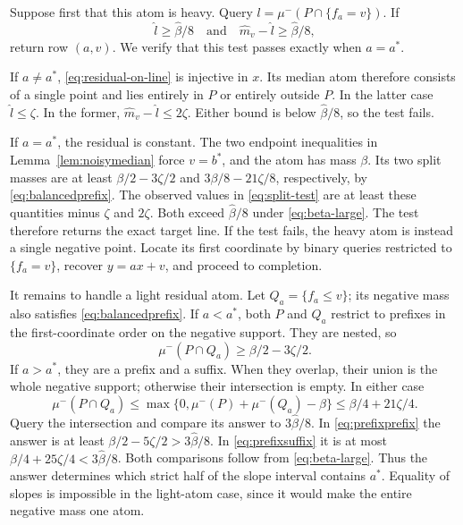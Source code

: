 \documentclass[11pt,letterpaper,pmlr,twoside]{jmlr}
\begin{document}
Suppose first that this atom is heavy. Query $l=\mu^-(P\cap\{f_a=v\})$. If
\begin{equation}
 \hat l\ge\hat\beta/8\quad\text{and}\quad
 \hat m_v-\hat l\ge\hat\beta/8,
\label{eq:split-test}
\end{equation}
return row $(a,v)$. We verify that this test passes exactly when $a=a^*$.

If $a\ne a^*$, \eqref{eq:residual-on-line} is injective in $x$. Its median atom therefore consists of a single point and lies entirely in $P$ or entirely outside $P$. In the latter case $\hat l\le\zeta$. In the former, $\hat m_v-\hat l\le2\zeta$. Either bound is below $\hat\beta/8$, so the test fails.

If $a=a^*$, the residual is constant. The two endpoint inequalities in Lemma~\ref{lem:noisymedian} force $v=b^*$, and the atom has mass $\beta$. Its two split masses are at least $\beta/2-3\zeta/2$ and $3\beta/8-21\zeta/8$, respectively, by \eqref{eq:balancedprefix}. The observed values in \eqref{eq:split-test} are at least these quantities minus $\zeta$ and $2\zeta$. Both exceed $\hat\beta/8$ under \eqref{eq:beta-large}. The test therefore returns the exact target line. If the test fails, the heavy atom is instead a single negative point. Locate its first coordinate by binary queries restricted to $\{f_a=v\}$, recover $y=ax+v$, and proceed to completion.

It remains to handle a light residual atom. Let $Q_a=\{f_a\le v\}$; its negative mass also satisfies \eqref{eq:balancedprefix}. If $a<a^*$, both $P$ and $Q_a$ restrict to prefixes in the first-coordinate order on the negative support. They are nested, so
\begin{equation}
 \mu^-(P\cap Q_a)\ge\beta/2-3\zeta/2.
\label{eq:prefixprefix}
\end{equation}
If $a>a^*$, they are a prefix and a suffix. When they overlap, their union is the whole negative support; otherwise their intersection is empty. In either case
\begin{equation}
 \mu^-(P\cap Q_a)
 \le\max\{0,\mu^-(P)+\mu^-(Q_a)-\beta\}
 \le\beta/4+21\zeta/4.
\label{eq:prefixsuffix}
\end{equation}
Query the intersection and compare its answer to $3\hat\beta/8$. In \eqref{eq:prefixprefix} the answer is at least $\beta/2-5\zeta/2>3\hat\beta/8$. In \eqref{eq:prefixsuffix} it is at most $\beta/4+25\zeta/4<3\hat\beta/8$. Both comparisons follow from \eqref{eq:beta-large}. Thus the answer determines which strict half of the slope interval contains $a^*$. Equality of slopes is impossible in the light-atom case, since it would make the entire negative mass one atom.
\end{document}
